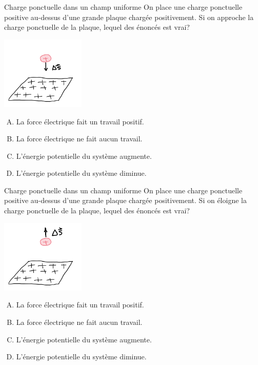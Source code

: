 \documentclass{beamer}
\begin{document}

\begin{frame}{Charge ponctuelle dans un champ uniforme}
  On place une charge ponctuelle positive au-dessus d'une grande plaque chargée
  positivement. Si on approche la charge ponctuelle de la plaque, lequel des
  énoncés est vrai?

  \begin{center}
    \includegraphics[width=0.3\textwidth]{figures/charge_dessus_plaque_approche.png}
  \end{center}

  \begin{enumerate}[A.]
    \item La force électrique fait un travail positif.
    \item La force électrique ne fait aucun travail.
    \item<alert@2> L'énergie potentielle du système augmente.
    \item L'énergie potentielle du système diminue.
  \end{enumerate}

\end{frame}


\begin{frame}{Charge ponctuelle dans un champ uniforme}
  On place une charge ponctuelle positive au-dessus d'une grande plaque chargée
  positivement. Si on éloigne la charge ponctuelle de la plaque, lequel des
  énoncés est vrai?

  \begin{center}
    \includegraphics[width=0.3\textwidth]{figures/charge_dessus_plaque_eloigne.png}
  \end{center}

  \begin{enumerate}[A.]
    \item<alert@2> La force électrique fait un travail positif.
    \item La force électrique ne fait aucun travail.
    \item L'énergie potentielle du système augmente.
    \item<alert@2> L'énergie potentielle du système diminue.
  \end{enumerate}

\end{frame}
\end{document}
